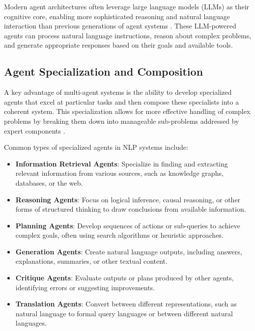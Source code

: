 Modern agent architectures often leverage large language models (LLMs) as their cognitive core, enabling more sophisticated reasoning and natural language interaction than previous generations of agent systems \citep{langchain2025langgraph}. These LLM-powered agents can process natural language instructions, reason about complex problems, and generate appropriate responses based on their goals and available tools.

\subsection{Agent Specialization and Composition}
\label{sec:agent-specialization}
A key advantage of multi-agent systems is the ability to develop specialized agents that excel at particular tasks and then compose these specialists into a coherent system. This specialization allows for more effective handling of complex problems by breaking them down into manageable sub-problems addressed by expert components \citep{aws2025multiagent}.

Common types of specialized agents in NLP systems include:

\begin{itemize}
    \item \textbf{Information Retrieval Agents}: Specialize in finding and extracting relevant information from various sources, such as knowledge graphs, databases, or the web.
    
    \item \textbf{Reasoning Agents}: Focus on logical inference, causal reasoning, or other forms of structured thinking to draw conclusions from available information.
    
    \item \textbf{Planning Agents}: Develop sequences of actions or sub-queries to achieve complex goals, often using search algorithms or heuristic approaches.
    
    \item \textbf{Generation Agents}: Create natural language outputs, including answers, explanations, summaries, or other textual content.
    
    \item \textbf{Critique Agents}: Evaluate outputs or plans produced by other agents, identifying errors or suggesting improvements.
    
    \item \textbf{Translation Agents}: Convert between different representations, such as natural language to formal query languages or between different natural languages.
\end{itemize}

